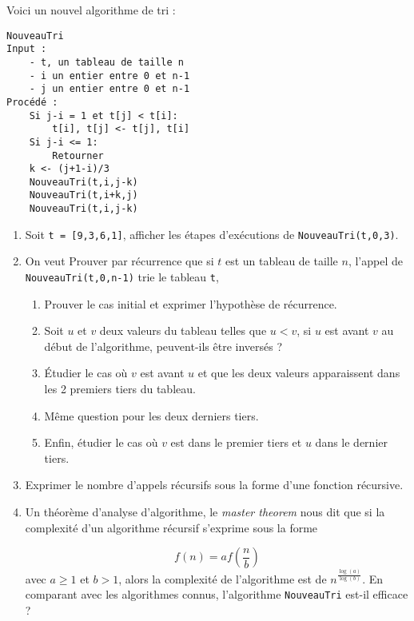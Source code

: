 \documentclass{../cours}
\begin{document}
\begin{exercice}
Voici un nouvel algorithme de tri :

\begin{lstlisting}
NouveauTri
Input :
    - t, un tableau de taille n
    - i un entier entre 0 et n-1
    - j un entier entre 0 et n-1
Procédé :
    Si j-i = 1 et t[j] < t[i]:
        t[i], t[j] <- t[j], t[i]
    Si j-i <= 1:
        Retourner
    k <- (j+1-i)/3
    NouveauTri(t,i,j-k)
    NouveauTri(t,i+k,j)
    NouveauTri(t,i,j-k)
\end{lstlisting}

\begin{enumerate}
\item Soit {\tt t = [9,3,6,1]}, afficher les étapes d'exécutions de {\tt NouveauTri(t,0,3)}.
\item On veut Prouver par récurrence que si $t$ est un tableau de taille $n$, l'appel de {\tt NouveauTri(t,0,n-1)} trie le tableau {\tt t},
\begin{enumerate}
\item Prouver le cas initial et exprimer l'hypothèse de récurrence.
\item Soit $u$ et $v$ deux valeurs du tableau telles que $u < v$, si $u$ est avant $v$ au début de l'algorithme, peuvent-ils être inversés ?
\item \'Etudier le cas où $v$ est avant $u$ et que les deux valeurs apparaissent dans les 2 premiers tiers du tableau.
\item Même question pour les deux derniers tiers.
\item Enfin, étudier le cas où $v$ est dans le premier tiers et $u$ dans le dernier tiers.
\end{enumerate}

\item Exprimer le nombre d'appels récursifs sous la forme d'une fonction récursive.
\item Un théorème d'analyse d'algorithme, le \emph{master theorem} nous dit que si la complexité
d'un algorithme récursif s'exprime sous la forme 

\begin{equation}
f(n) = a f\left( \frac{n}{b} \right)
\end{equation}
avec $a \geq 1$ et $b > 1$, alors la complexité de l'algorithme est de $n^{\frac{\log(a)}{\log(b)}}$. En comparant avec les algorithmes connus, l'algorithme {\tt NouveauTri} est-il efficace ?
\end{enumerate}
\end{exercice}
\end{document}

